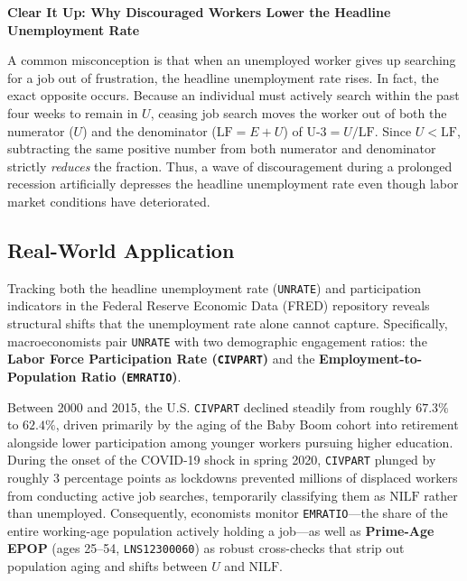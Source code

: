 \documentclass[11pt, a4paper]{article}
\newcommand{\boxheader}[2]{\textbf{\textcolor{#1}{#2}}\par\smallskip}
\begin{document}
\begin{coreprinciple}
\boxheader{Terracotta}{Clear It Up: Why Discouraged Workers Lower the Headline Unemployment Rate}
A common misconception is that when an unemployed worker gives up searching for a job out of frustration, the headline unemployment rate rises. In fact, the exact opposite occurs. Because an individual must actively search within the past four weeks to remain in $U$, ceasing job search moves the worker out of both the numerator ($U$) and the denominator ($\text{LF} = E + U$) of $\text{U-3} = U / \text{LF}$. Since $U < \text{LF}$, subtracting the same positive number from both numerator and denominator strictly \emph{reduces} the fraction. Thus, a wave of discouragement during a prolonged recession artificially depresses the headline unemployment rate even though labor market conditions have deteriorated.
\end{coreprinciple}

\subsection*{Real-World Application}
Tracking both the headline unemployment rate (\texttt{UNRATE}) and participation indicators in the Federal Reserve Economic Data (FRED) repository reveals structural shifts that the unemployment rate alone cannot capture. Specifically, macroeconomists pair \texttt{UNRATE} with two demographic engagement ratios: the \textbf{Labor Force Participation Rate (\texttt{CIVPART})} and the \textbf{Employment-to-Population Ratio (\texttt{EMRATIO})}.

Between 2000 and 2015, the U.S. \texttt{CIVPART} declined steadily from roughly $67.3\%$ to $62.4\%$, driven primarily by the aging of the Baby Boom cohort into retirement alongside lower participation among younger workers pursuing higher education. During the onset of the COVID-19 shock in spring 2020, \texttt{CIVPART} plunged by roughly $3$ percentage points as lockdowns prevented millions of displaced workers from conducting active job searches, temporarily classifying them as $\text{NILF}$ rather than unemployed. Consequently, economists monitor \texttt{EMRATIO}—the share of the entire working-age population actively holding a job—as well as \textbf{Prime-Age EPOP} (ages 25--54, \texttt{LNS12300060}) as robust cross-checks that strip out population aging and shifts between $U$ and $\text{NILF}$.
\end{document}
